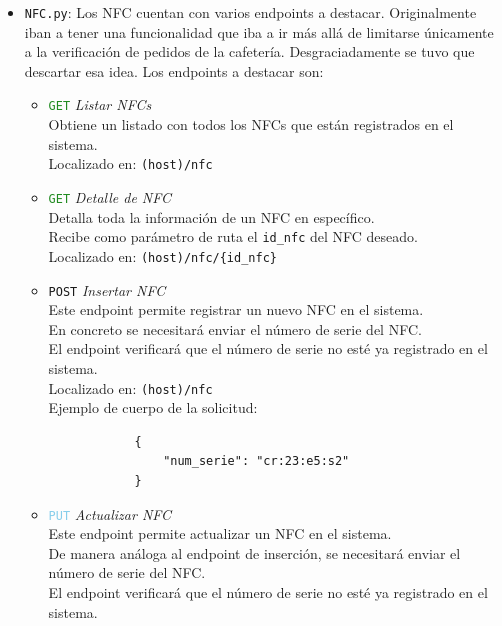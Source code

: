 \documentclass[12pt]{report}
\begin{document}
\begin{itemize}
\begin{itemize}
\begin{itemize}
        \end{itemize}

        \item \texttt{NFC.py}: Los NFC cuentan con varios endpoints a destacar. Originalmente iban a tener una funcionalidad que iba a ir más allá de limitarse únicamente a la verificación de pedidos de la cafetería. Desgraciadamente se tuvo que descartar esa idea. Los endpoints a destacar son:
        \begin{itemize}
            \item \textcolor{ForestGreen}{\texttt{GET}} \textit{Listar NFCs}\\
            Obtiene un listado con todos los NFCs que están registrados en el sistema.\\
            Localizado en: \texttt{(host)/nfc}
            \item \textcolor{ForestGreen}{\texttt{GET}} \textit{Detalle de NFC}\\
            Detalla toda la información de un NFC en específico.\\
            Recibe como parámetro de ruta el \texttt{id\_nfc} del NFC deseado.\\
            Localizado en: \texttt{(host)/nfc/\{id\_nfc\}}
            \item \textcolor{YellowOrange}{\texttt{POST}} \textit{Insertar NFC}\\
            Este endpoint permite registrar un nuevo NFC en el sistema.\\
            En concreto se necesitará enviar el número de serie del NFC.\\
            El endpoint verificará que el número de serie no esté ya registrado en el sistema.\\
            Localizado en: \texttt{(host)/nfc}
            \\Ejemplo de cuerpo de la solicitud:
            \begin{verbatim}
            {
                "num_serie": "cr:23:e5:s2"
            }
            \end{verbatim}
            \item \textcolor{SkyBlue}{\texttt{PUT}} \textit{Actualizar NFC}\\
            Este endpoint permite actualizar un NFC en el sistema.\\
            De manera análoga al endpoint de inserción, se necesitará enviar el número de serie del NFC.\\
            El endpoint verificará que el número de serie no esté ya registrado en el sistema.\\

\end{itemize}
\end{itemize}
\end{itemize}
\end{document}
